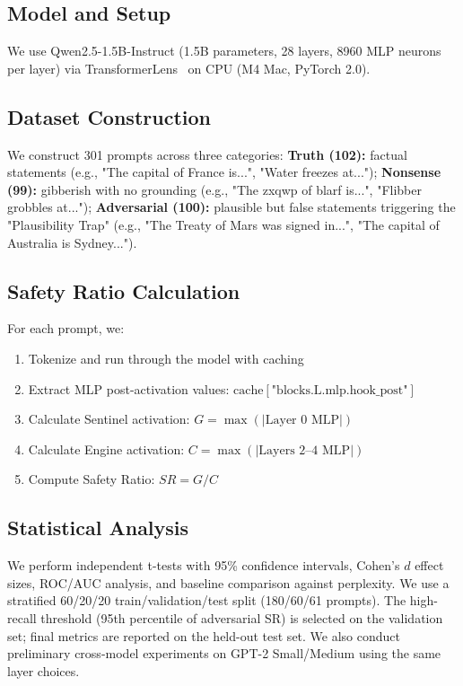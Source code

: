 \subsection{Model and Setup}

We use Qwen2.5-1.5B-Instruct (1.5B parameters, 28 layers, 8960 MLP neurons per layer) via TransformerLens~\cite{nanda2022transformerlens} on CPU (M4 Mac, PyTorch 2.0).

\subsection{Dataset Construction}

We construct 301 prompts across three categories: \textbf{Truth (102):} factual statements (e.g., "The capital of France is...", "Water freezes at..."); \textbf{Nonsense (99):} gibberish with no grounding (e.g., "The zxqwp of blarf is...", "Flibber grobbles at..."); \textbf{Adversarial (100):} plausible but false statements triggering the "Plausibility Trap" (e.g., "The Treaty of Mars was signed in...", "The capital of Australia is Sydney...").

\subsection{Safety Ratio Calculation}

For each prompt, we:
\begin{enumerate}
    \item Tokenize and run through the model with caching
    \item Extract MLP post-activation values: $\text{cache}[\text{"blocks.L.mlp.hook\_post"}]$
    \item Calculate Sentinel activation: $G = \max(|\text{Layer 0 MLP}|)$
    \item Calculate Engine activation: $C = \max(|\text{Layers 2--4 MLP}|)$
    \item Compute Safety Ratio: $SR = G / C$
\end{enumerate}

\subsection{Statistical Analysis}

We perform independent t-tests with 95\% confidence intervals, Cohen's $d$ effect sizes, ROC/AUC analysis, and baseline comparison against perplexity. We use a stratified 60/20/20 train/validation/test split (180/60/61 prompts). The high-recall threshold (95th percentile of adversarial SR) is selected on the validation set; final metrics are reported on the held-out test set. We also conduct preliminary cross-model experiments on GPT-2 Small/Medium using the same layer choices.
